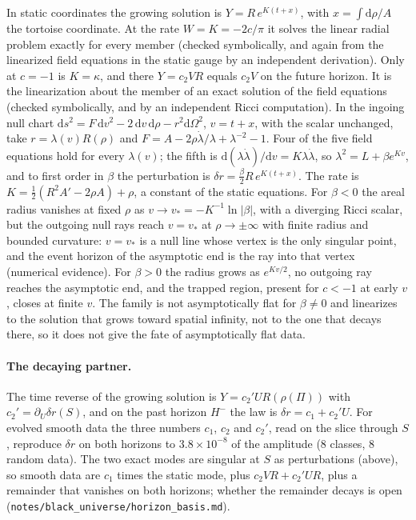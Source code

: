 \documentclass[11pt]{article}
\theoremstyle{plain}
\newcommand{\dd}{\mathrm{d}}
\begin{document}
In static coordinates the growing solution is $Y=R\,e^{K(t+x)}$, with $x=\int\dd\rho/A$ the tortoise coordinate. At the
rate $W=K=-2c/\pi$ it solves the linear radial problem exactly for every member (checked symbolically, and again from the
linearized field equations in the static gauge by an independent derivation). Only at $c=-1$ is $K=\kappa$, and there
$Y=c_2VR$ equals $c_2V$ on the future horizon. It is the linearization about the member of an exact solution of the field equations (checked symbolically, and by an
independent Ricci computation). In the ingoing null chart $\dd s^2=F\,\dd v^2-2\,\dd v\,\dd\rho-r^2\dd\Omega^2$, $v=t+x$, with the
scalar unchanged, take $r=\lambda(v)R(\rho)$ and $F=A-2\rho\dot\lambda/\lambda+\lambda^{-2}-1$. Four of the five field equations hold
for every $\lambda(v)$; the fifth is $\dd(\lambda\dot\lambda)/\dd v=K\lambda\dot\lambda$, so $\lambda^2=L+\beta e^{Kv}$, and to first order in
$\beta$ the perturbation is $\delta r=\tfrac\beta2R\,e^{K(t+x)}$. The rate is $K=\tfrac12(R^2A'-2\rho A)+\rho$, a constant of the static
equations. For $\beta<0$ the areal radius vanishes at fixed $\rho$ as $v\to v_*=-K^{-1}\ln|\beta|$, with a diverging Ricci scalar,
but the outgoing null rays reach $v=v_*$ at $\rho\to\pm\infty$ with finite radius and bounded curvature: $v=v_*$ is a null line
whose vertex is the only singular point, and the event horizon of the asymptotic end is the ray into that vertex (numerical
evidence). For $\beta>0$ the radius grows as $e^{Kv/2}$, no outgoing ray reaches the asymptotic end, and the trapped region,
present for $c<-1$ at early $v$, closes at finite $v$. The family is not asymptotically flat for $\beta\ne0$ and linearizes to the solution that grows
toward spatial infinity, not to the one that decays there, so it does not give the fate of asymptotically flat data.

\paragraph{The decaying partner.} The time reverse of the growing solution is $Y=c_2'UR(\rho(\Pi))$ with $c_2'=\partial_U\delta r(S)$,
and on the past horizon $H^-$ the law is $\delta r=c_1+c_2'U$. For evolved smooth data the three numbers $c_1$, $c_2$ and $c_2'$, read
on the slice through $S$, reproduce $\delta r$ on both horizons to $3.8\times10^{-8}$ of the amplitude (8 classes, 8 random data). The
two exact modes are singular at $S$ as perturbations (above), so smooth data are $c_1$ times the static mode, plus $c_2VR+c_2'UR$, plus
a remainder that vanishes on both horizons; whether the remainder decays is open (\texttt{notes/black\_universe/horizon\_basis.md}).
\end{document}
